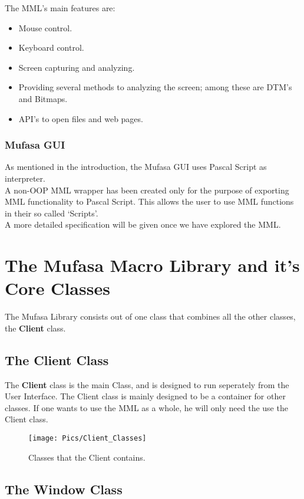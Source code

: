 \documentclass[a4paper, 10pt]{report} %
\begin{document}
The MML's main features are:
\begin{itemize}
	\item Mouse control.
	\item Keyboard control.
	\item Screen capturing and analyzing.
	\item Providing several methods to analyzing the screen; among these
		  are DTM's and Bitmaps.
	\item API's to open files and web pages.
\end{itemize}

\subsection{Mufasa GUI}

As mentioned in the introduction, the Mufasa GUI uses Pascal Script as 
interpreter. \\ 

A non-OOP MML wrapper has been created only for the purpose
of exporting MML functionality to Pascal Script. 
This allows the user to use MML functions in their so called `Scripts'. \\
A more detailed specification will be given once we have explored the MML.

\chapter{The Mufasa Macro Library and it's Core Classes}

The Mufasa Library consists out of one class that combines all the other
classes, the \textbf{Client} class.

\section{The Client Class}

The \textbf{Client} class is the main Class, and is designed 
to run seperately from the User Interface.
The Client class is mainly designed to be a container for other classes.
If one wants to use the MML as a whole, he will only need the use 
the Client class.

\begin{figure}[ht]
	\texttt{[image: Pics/Client\_Classes]}
	\caption{Classes that the Client contains.}
\end{figure}

\pagebreak

\section{The Window Class}
\end{document}
